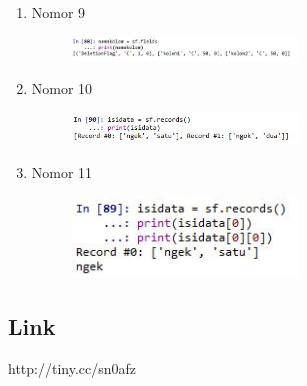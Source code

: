 \begin{enumerate}
\begin{figure}[H]
		\centering
	\end{figure}
	\item Nomor 9
	
	\begin{figure}[H]
		\includegraphics[width=6cm]{figures/Tugas3/1174086/No9.jpg}
		\centering
	\end{figure}
	\item Nomor 10
	
	\begin{figure}[H]
		\includegraphics[width=6cm]{figures/Tugas3/1174086/No10.jpg}
		\centering
	\end{figure}
	\item Nomor 11
	
	\begin{figure}[H]
		\includegraphics[width=6cm]{figures/Tugas3/1174086/No11.jpg}
		\centering
	\end{figure}
\end{enumerate}
\subsection{Link}
http://tiny.cc/sn0afz